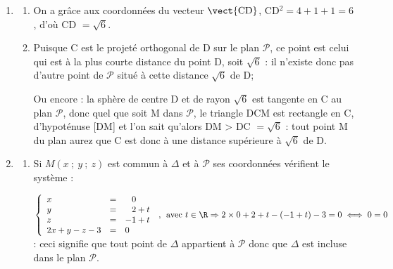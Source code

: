 \begin{enumerate}
\begin{enumerate}
Puisque $\vect{\text{CD}} \cdot \vect{\text{AC}}  = 0$ les droites (CD) et (AC) sont perpendiculaires en C, donc C est le projeté orthogonal de D sur le plan $\mathcal{P}$.
		\item %
		Puisque $\vect{\text{CD}}$ est un vecteur normal au plan $\mathcal{P}$, on sait que ses cordonnées sont dans l'ordre les coefficients $a, \: b,\:c$ de $x,\:y,\:z$, soit :
		
$M(x~;~y~;~z) \in \mathcal{P} \iff 2x + 1y - 1z + d = 0$.

En particulier C$(2~;~-2~;~ -1) \in \mathcal{P} \iff 2\times 2  + 1\times (- 2)  - 1\times (- 1) + d = 0 \iff 4 - 2 + 1 + d = 0 \iff d = - 3$.

Finalement : $M(x~;~y~;~z) \in \mathcal{P} \iff 2x + y - z - 3 = 0$.
	\end{enumerate}
\item 
	\begin{enumerate}
		\item %
On a grâce aux coordonnées du vecteur $\vect{\text{CD}}$, \:CD$^2 = 4 + 1 + 1 = 6$, d'où CD $ = \sqrt 6$.
		\item %
Puisque C est le projeté orthogonal de D sur le plan $\mathcal{P}$, ce point est celui qui est à la plus courte distance du point D, soit $\sqrt 6$ : il n'existe donc pas d'autre point de $\mathcal{P}$ situé à cette distance $\sqrt 6$ de D;

Ou encore : la sphère de centre D et de rayon $\sqrt 6$ est tangente en C au plan $\mathcal{P}$, donc quel que soit M dans $\mathcal{P}$, le triangle DCM est rectangle en C, d'hypoténuse [DM] et l'on sait qu'alors DM > DC $= \sqrt 6$ : tout point M du plan aurez que C est donc à une distance supérieure à $\sqrt 6$ de D.
	\end{enumerate}
\item 
	\begin{enumerate}
		\item %
Si $M(x~;~y~;~z)$ est commun à $\Delta$ et à $\mathcal{P}$ ses coordonnées vérifient le système :

$\left\{\begin{array}{l c l}
x &=&\phantom{-}0\\
y &=&\phantom{-}2 + t\\
z &=& -1 + t\\
2x + y - z - 3 &=& 0
\end{array}\right.\:,\:\: \text{avec } t\in \R \Rightarrow 2 \times 0  + 2 + t  - (- 1 + t) - 3 = 0 \iff 0 = 0$ : ceci signifie que tout point de $\Delta$ appartient à $\mathcal{P}$ donc que $\Delta$ est incluse dans le plan $\mathcal{P}$.


\end{enumerate}
\end{enumerate}
